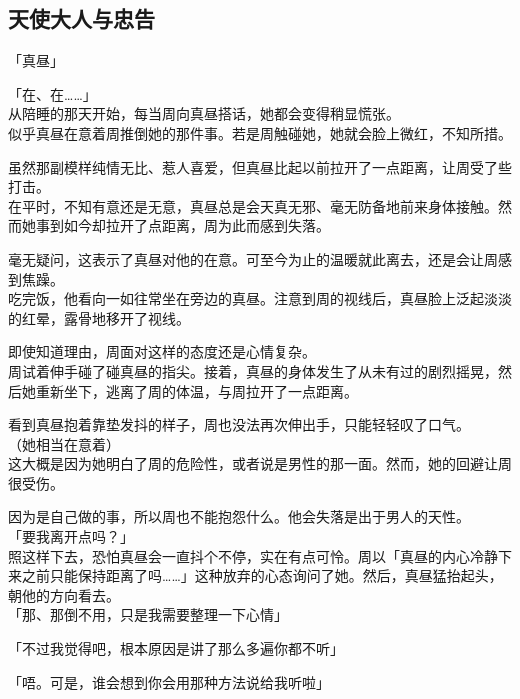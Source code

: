 \subsection{天使大人与忠告}

「真昼」

「在、在……」\\

从陪睡的那天开始，每当周向真昼搭话，她都会变得稍显慌张。\\

似乎真昼在意着周推倒她的那件事。若是周触碰她，她就会脸上微红，不知所措。

虽然那副模样纯情无比、惹人喜爱，但真昼比起以前拉开了一点距离，让周受了些打击。\\

在平时，不知有意还是无意，真昼总是会天真无邪、毫无防备地前来身体接触。然而她事到如今却拉开了点距离，周为此而感到失落。

毫无疑问，这表示了真昼对他的在意。可至今为止的温暖就此离去，还是会让周感到焦躁。\\

吃完饭，他看向一如往常坐在旁边的真昼。注意到周的视线后，真昼脸上泛起淡淡的红晕，露骨地移开了视线。

即使知道理由，周面对这样的态度还是心情复杂。\\

周试着伸手碰了碰真昼的指尖。接着，真昼的身体发生了从未有过的剧烈摇晃，然后她重新坐下，逃离了周的体温，与周拉开了一点距离。

看到真昼抱着靠垫发抖的样子，周也没法再次伸出手，只能轻轻叹了口气。\\

（她相当在意着）\\

这大概是因为她明白了周的危险性，或者说是男性的那一面。然而，她的回避让周很受伤。

因为是自己做的事，所以周也不能抱怨什么。他会失落是出于男人的天性。\\

「要我离开点吗？」\\

照这样下去，恐怕真昼会一直抖个不停，实在有点可怜。周以「真昼的内心冷静下来之前只能保持距离了吗……」这种放弃的心态询问了她。然后，真昼猛抬起头，朝他的方向看去。\\

「那、那倒不用，只是我需要整理一下心情」

「不过我觉得吧，根本原因是讲了那么多遍你都不听」

「唔。可是，谁会想到你会用那种方法说给我听啦」

